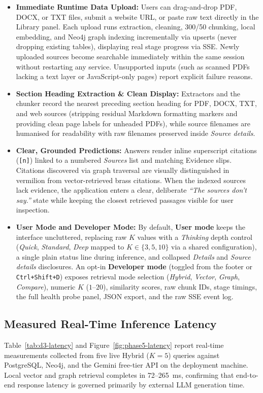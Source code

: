 \documentclass[11pt,a4paper]{article}
\begin{document}
\begin{itemize}[leftmargin=*]
  \item \textbf{Immediate Runtime Data Upload:} Users can drag-and-drop PDF, DOCX, or TXT files, submit a website URL, or paste raw text directly in the Library panel. Each upload runs extraction, cleaning, 300/50 chunking, local embedding, and Neo4j graph indexing incrementally via upserts (never dropping existing tables), displaying real stage progress via SSE. Newly uploaded sources become searchable immediately within the same session without restarting any service. Unsupported inputs (such as scanned PDFs lacking a text layer or JavaScript-only pages) report explicit failure reasons.
  \item \textbf{Section Heading Extraction \& Clean Display:} Extractors and the chunker record the nearest preceding section heading for PDF, DOCX, TXT, and web sources (stripping residual Markdown formatting markers and providing clean page labels for unheaded PDFs), while source filenames are humanised for readability with raw filenames preserved inside \emph{Source details}.
  \item \textbf{Clear, Grounded Predictions:} Answers render inline superscript citations (\texttt{[n]}) linked to a numbered \emph{Sources} list and matching Evidence slips. Citations discovered via graph traversal are visually distinguished in vermilion from vector-retrieved brass citations. When the indexed sources lack evidence, the application enters a clear, deliberate \emph{``The sources don't say.''} state while keeping the closest retrieved passages visible for user inspection.
  \item \textbf{User Mode and Developer Mode:} By default, \textbf{User mode} keeps the interface uncluttered, replacing raw $K$ values with a \emph{Thinking} depth control (\emph{Quick}, \emph{Standard}, \emph{Deep} mapped to $K \in \{3, 5, 10\}$ via a shared configuration), a single plain status line during inference, and collapsed \emph{Details} and \emph{Source details} disclosures. An opt-in \textbf{Developer mode} (toggled from the footer or \texttt{Ctrl+Shift+D}) exposes retrieval mode selection (\emph{Hybrid}, \emph{Vector}, \emph{Graph}, \emph{Compare}), numeric $K$ ($1$--$20$), similarity scores, raw chunk IDs, stage timings, the full health probe panel, JSON export, and the raw SSE event log.
\end{itemize}

\subsection{Measured Real-Time Inference Latency}
Table~\ref{tab:d3-latency} and Figure~\ref{fig:phase5-latency} report real-time measurements collected from five live Hybrid ($K=5$) queries against PostgreSQL, Neo4j, and the Gemini free-tier API on the deployment machine. Local vector and graph retrieval completes in 72--265~ms, confirming that end-to-end response latency is governed primarily by external LLM generation time.
\end{document}
